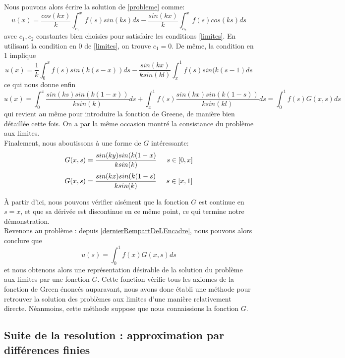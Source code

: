 \documentclass[12pt]{article}
\newcommand{\espace}{\hspace{5mm}}
\begin{document}
Nous pouvons alors écrire la solution de \eqref{probleme} comme:
\begin{equation}
u(x) = \frac{cos(kx)}{k} \int_{c_1}^x f(s) sin (ks) ds - \frac{sin(kx)}{k} \int_{c_2}^x f(s) cos (ks) ds
\end{equation}
avec $c_1, c_2$ constantes bien choisies pour satisfaire les conditions \eqref{limites}. En utilisant la condition en 0 de \eqref{limites}, on trouve $c_1 = 0$. De même, la condition en 1 implique
\begin{equation}
u(x) = \frac{1}{k} \int_0^x f(s) sin (k(s-x)) ds - \frac{sin(kx)}{k sin(kl)} \int_x^1 f(s) sin(k(s-1) ds
\end{equation}
ce qui nous donne enfin
\begin{dmath}
u(x) =  \int_0^x\frac{sin(ks) sin(k(1-x))}{k sin(k)}ds + \int_x^1 f(s) \frac{sin(kx) sin(k(1-s))}{k sin(kl)} ds = \int_0^1 f(s) G(x,s) ds
\end{dmath}
qui revient au même pour introduire la fonction de Greene, de manière bien détaillée cette fois. On a par la même occasion montré la consistance du problème aux limites. \\
Finalement, nous aboutissons à une forme de $G$ intéressante:
\begin{equation}
G(x, s) = \frac{sin(ky) sin(k(1-x)}{k sin(k)} \espace s\in [0, x] 
\end{equation}
\begin{equation}
G(x, s) = \frac{sin(kx) sin(k(1-s)}{k sin(k)} \espace s\in [x,1]
\end{equation}

À partir d'ici, nous pouvons vérifier aisément que la fonction $G$ est continue en $s=x$, et que sa dérivée est discontinue en ce même point, ce qui termine notre démonstration.
\newline
\\
Revenons au problème : depuis \eqref{dernierRempartDeLEncadre}, nous pouvons alors conclure que
\begin{equation}
u(s) = \int_0^1 f(x)G(x, s) ds
\end{equation}
et nous obtenons alors une représentation désirable de la solution du problème aux limites par une fonction $G$. Cette fonction vérifie tous les axiomes de la fonction de Green énoncés auparavant, nous avons donc établi une méthode pour retrouver la solution des problèmes aux limites d'une manière relativement directe. Néanmoins, cette méthode suppose que nous connaissions la fonction $G$.

\subsection{Suite de la resolution : approximation par différences finies}
\end{document}
